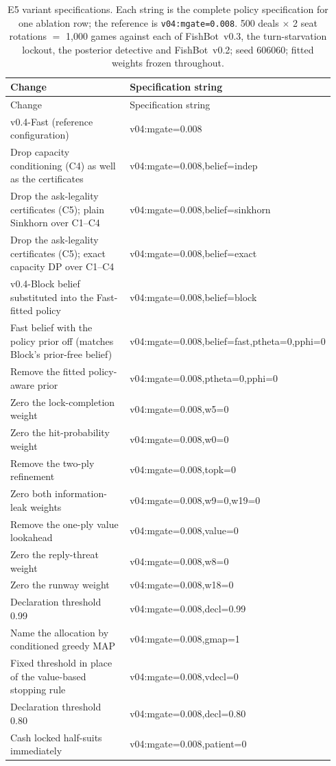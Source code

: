 \documentclass[11pt]{article}
\theoremstyle{definition}
\DeclareRobustCommand{\vfast}{\texorpdfstring{\mbox{v0.4-Fast}}{v0.4-Fast}}
\DeclareRobustCommand{\vblock}{\texorpdfstring{\mbox{v0.4-Block}}{v0.4-Block}}
\DeclareRobustCommand{\vthree}{\texorpdfstring{\mbox{FishBot v0.3}}{FishBot v0.3}}
\DeclareRobustCommand{\vtwo}{\texorpdfstring{\mbox{FishBot v0.2}}{FishBot v0.2}}
\newcommand{\numAblGames}{1{,}000}
\newcommand{\numAblDeals}{500}
\begin{document}
\begin{longtable}{@{}>{\footnotesize}p{0.42\linewidth}>{\footnotesize\ttfamily}p{0.52\linewidth}@{}}
\caption{E5 variant specifications. Each string is the complete policy
specification for one ablation row; the reference is
\texttt{v04:mgate=0.008}. \numAblDeals{} deals $\times$ 2 seat rotations
$=$ \numAblGames{} games against each of \vthree{}, the turn-starvation
lockout, the posterior detective and \vtwo{}; seed 606060; fitted weights
frozen throughout.}
\label{tab:ablspecs}\\
\toprule
\normalfont Change & \normalfont Specification string \\
\midrule
\endfirsthead
\toprule
\normalfont Change & \normalfont Specification string \\
\midrule
\endhead
\vfast{} (reference configuration) & v04:mgate=0.008 \\
\addlinespace
Drop capacity conditioning (C4) as well as the certificates & v04:mgate=0.008,belief=indep \\
Drop the ask-legality certificates (C5); plain Sinkhorn over C1--C4 & v04:mgate=0.008,belief=sinkhorn \\
Drop the ask-legality certificates (C5); exact capacity DP over C1--C4 & v04:mgate=0.008,belief=exact \\
\vblock{} belief substituted into the Fast-fitted policy & v04:mgate=0.008,belief=block \\
Fast belief with the policy prior off (matches Block's prior-free belief) & v04:mgate=0.008,belief=fast,ptheta=0,pphi=0 \\
Remove the fitted policy-aware prior & v04:mgate=0.008,ptheta=0,pphi=0 \\
\addlinespace
Zero the lock-completion weight & v04:mgate=0.008,w5=0 \\
Zero the hit-probability weight & v04:mgate=0.008,w0=0 \\
Remove the two-ply refinement & v04:mgate=0.008,topk=0 \\
Zero both information-leak weights & v04:mgate=0.008,w9=0,w19=0 \\
Remove the one-ply value lookahead & v04:mgate=0.008,value=0 \\
Zero the reply-threat weight & v04:mgate=0.008,w8=0 \\
Zero the runway weight & v04:mgate=0.008,w18=0 \\
\addlinespace
Declaration threshold 0.99 & v04:mgate=0.008,decl=0.99 \\
Name the allocation by conditioned greedy MAP & v04:mgate=0.008,gmap=1 \\
Fixed threshold in place of the value-based stopping rule & v04:mgate=0.008,vdecl=0 \\
Declaration threshold 0.80 & v04:mgate=0.008,decl=0.80 \\
Cash locked half-suits immediately & v04:mgate=0.008,patient=0 \\
\bottomrule
\end{longtable}
\end{document}
